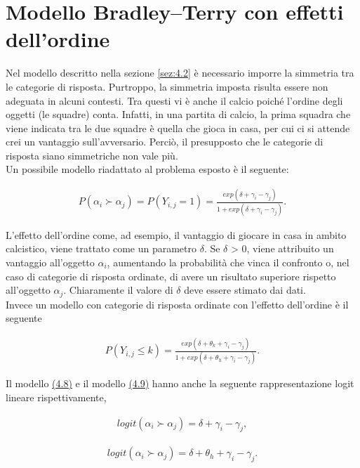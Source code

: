 \section{Modello Bradley–Terry con effetti dell'ordine} \label{sez:4.3}
Nel modello descritto nella sezione \ref{sez:4.2} è necessario imporre la simmetria tra le categorie di risposta. Purtroppo, la simmetria imposta risulta essere non adeguata in alcuni contesti. Tra questi vi è anche il calcio poiché l'ordine degli oggetti (le squadre) conta. Infatti, in una partita di calcio, la prima squadra che viene indicata tra le due squadre è quella che gioca in casa, per cui ci si attende crei un vantaggio sull'avversario. Perciò, il presupposto che le categorie di risposta siano simmetriche non vale più. \\
Un possibile modello riadattato al problema esposto è il seguente:

\begin{align} 
	P(\alpha_{i}\succ \alpha_{j}) = P(Y_{i,j} = 1) = \frac{exp(\delta + \gamma_{i} - \gamma_{j})}{1 + exp(\delta + \gamma_{i} - \gamma_{j})} \label{for:3.8}. 
\end{align}

L'effetto dell'ordine come, ad esempio, il vantaggio di giocare in casa in ambito calcistico, viene trattato come un parametro $\delta$. Se $\delta$ > 0, viene attribuito un vantaggio all'oggetto $\alpha_{i}$, aumentando la probabilità che vinca il confronto o, nel caso di categorie di risposta ordinate, di avere un risultato superiore rispetto all'oggetto $\alpha_{j}$. Chiaramente il valore di $\delta$ deve essere stimato dai dati.\\
Invece un modello con categorie di risposta ordinate con l'effetto dell'ordine è il seguente

\begin{align}
	P(Y_{i,j}\leq k) =  \frac{exp(\delta + \theta_{k} + \gamma_{i} - \gamma_{j})}{1 + exp(\delta + \theta_{h} + \gamma_{i} - \gamma_{j})} \label{for:3.9}.
\end{align}

Il modello \hyperref[for:3.8]{(4.8)} e il modello \hyperref[for:3.9]{(4.9)} hanno anche la seguente rappresentazione logit lineare rispettivamente,

\begin{align}
	logit(\alpha_{i} \succ \alpha_{j}) =  \delta + \gamma_i - \gamma_j,
\end{align}

\begin{align}
	logit(\alpha_{i} \succ \alpha_{j}) =  \delta + \theta_{h} + \gamma_i - \gamma_j.
\end{align}


